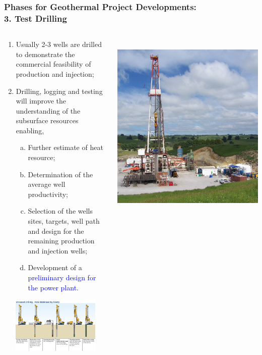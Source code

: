 \documentclass[10pt,compress]{beamer}
\newcommand{\blue}{\textcolor{blue}}
\begin{document}
\begin{frame}
 \frametitle{Phases for Geothermal Project Developments: \\ 3. Test Drilling}
  \begin{columns}
    \begin{column}[l]{0.45\linewidth}     
       \begin{enumerate}[{3.}1]\scriptsize
          \item <1-> Usually 2-3 wells are drilled to demonstrate the commercial feasibility of production and injection;
          \item <2-> Drilling, logging and testing will improve the understanding of the subsurface resources enabling,  
          \begin{enumerate}[(a)]\scriptsize
             \item<3-> Further estimate of heat resource;
             \item<4-> Determination of the average well productivity;
             \item<5-> Selection of the wells sites, targets, well path and design for the remaining production and injection wells;
             \item<6-> Development of a \blue{preliminary design for the power plant}.
          \end{enumerate}
       \end{enumerate}
           \includegraphics[width=5.6cm,height=2.7cm,clip]{./Pics/Uncased-Drilling-1.jpg}
    \end{column}
    \begin{column}[l]{0.55\linewidth} 
       \vbox{
          \hbox{
             \includegraphics[width=0.5\columnwidth,clip]{./Pics/Geothermal_drilling_at_Te_Mihi_NZ.jpg}
}}
\end{column}
\end{columns}
\end{frame}
\end{document}
